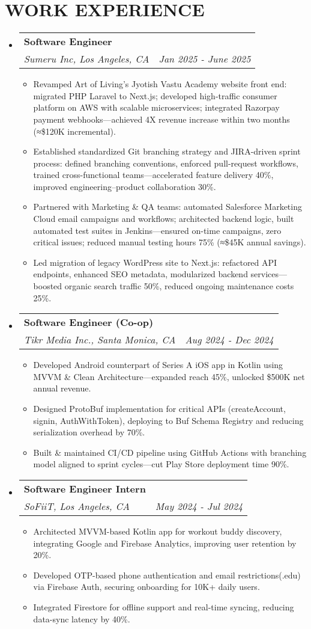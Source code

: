 \documentclass[letterpaper,11pt]{article}
\makeatletter
\newcommand{\resumeItem}[1]{
  \item\small{
    {#1 \vspace{-1pt}}
  }
}
\newcommand{\resumeSubheading}[4]{
  \vspace{-2pt}\item
    \begin{tabular*}{1.0\textwidth}[t]{l@{\extracolsep{\fill}}r}
      \textbf{\large#1} & \textbf{\small #2} \\
      \textit{\large#3} & \textit{\small #4} \\
      
    \end{tabular*}\vspace{-7pt}
}
\newcommand{\resumeSubHeadingListStart}{\begin{itemize}[leftmargin=0.0in, label={}]}
\newcommand{\resumeSubHeadingListEnd}{\end{itemize}}
\newcommand{\resumeItemListStart}{\begin{itemize}[leftmargin=0.1in]}
\newcommand{\resumeItemListEnd}{\end{itemize}\vspace{-5pt}}
\makeatother
\begin{document}
\section{\color{airforceblue}WORK EXPERIENCE}
  \resumeSubHeadingListStart

    \resumeSubheading
      {Software Engineer}{} 
      {Sumeru Inc, Los Angeles, CA}{Jan 2025 - June 2025}
      \resumeItemListStart
            \resumeItem{\normalsize{Revamped Art of Living's Jyotish Vastu Academy website front end: migrated PHP Laravel to Next.js; developed high-traffic consumer platform on AWS with scalable microservices; integrated Razorpay payment webhooks---achieved 4X revenue increase within two months (≈\$120K incremental).}}
            \resumeItem{\normalsize{Established standardized Git branching strategy and JIRA-driven sprint process: defined branching conventions, enforced pull-request workflows, trained cross-functional teams---accelerated feature delivery 40\%, improved engineering--product collaboration 30\%.}}  
            \resumeItem{\normalsize{Partnered with Marketing \& QA teams: automated Salesforce Marketing Cloud email campaigns and workflows; architected backend logic, built automated test suites in Jenkins---ensured on-time campaigns, zero critical issues; reduced manual testing hours 75\% (≈\$45K annual savings).}}
            \resumeItem{\normalsize{Led migration of legacy WordPress site to Next.js: refactored API endpoints, enhanced SEO metadata, modularized backend services---boosted organic search traffic 50\%, reduced ongoing maintenance costs 25\%.}}  
      \resumeItemListEnd  

    \resumeSubheading
      {Software Engineer (Co-op)}{} 
      {Tikr Media Inc., Santa Monica, CA}{Aug 2024 - Dec 2024}
      \resumeItemListStart
            \resumeItem{\normalsize{Developed Android counterpart of Series A iOS app in Kotlin using MVVM \& Clean Architecture---expanded reach 45\%, unlocked \$500K net annual revenue.}}
            \resumeItem{\normalsize{Designed ProtoBuf implementation for critical APIs (createAccount, signin, AuthWithToken), deploying to Buf Schema Registry and reducing serialization overhead by 70\%.}}  
            \resumeItem{\normalsize{Built \& maintained CI/CD pipeline using GitHub Actions with branching model aligned to sprint cycles---cut Play Store deployment time 90\%.}}  
      \resumeItemListEnd  

    \resumeSubheading
      {Software Engineer Intern}{} 
      {SoFiiT, Los Angeles, CA}{May 2024 - Jul 2024}
      \resumeItemListStart
            \resumeItem{\normalsize{Architected MVVM-based Kotlin app for workout buddy discovery, integrating Google and Firebase Analytics, improving user retention by 20\%.}}
            \resumeItem{\normalsize{Developed OTP-based phone authentication and email restrictions(.edu) via Firebase Auth, securing onboarding for 10K+ daily users.}}  
            \resumeItem{\normalsize{Integrated Firestore for offline support and real-time syncing, reducing data-sync latency by 40\%.}}  
      \resumeItemListEnd  
  \resumeSubHeadingListEnd
\vspace{-12pt}
\end{document}

